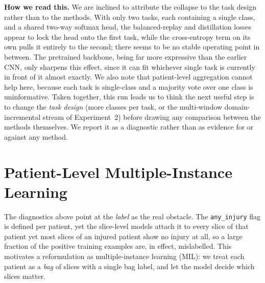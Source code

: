 \documentclass[11pt]{article}
\begin{document}
\noindent\textbf{How we read this.} We are inclined to attribute the collapse to
the task design rather than to the methods. With only two tasks, each containing a
single class, and a shared two-way softmax head, the balanced-replay and
distillation losses appear to lock the head onto the first task, while the
cross-entropy term on its own pulls it entirely to the second; there seems to be
no stable operating point in between. The pretrained backbone, being far more
expressive than the earlier CNN, only sharpens this effect, since it can fit
whichever single task is currently in front of it almost exactly. We also note
that patient-level aggregation cannot help here, because each task is single-class
and a majority vote over one class is uninformative. Taken together, this run
leads us to think the next useful step is to change the \emph{task design} (more
classes per task, or the multi-window domain-incremental stream of
Experiment~2) before drawing any comparison between the methods themselves. We
report it as a diagnostic rather than as evidence for or against any method.

\section{Patient-Level Multiple-Instance Learning}\label{sec:mil}
The diagnostics above point at the \emph{label} as the real obstacle. The
\texttt{any\_injury} flag is defined per patient, yet the slice-level models
attach it to every slice of that patient yet most slices of an injured patient
show no injury at all, so a large fraction of the positive training examples are,
in effect, mislabelled. This motivates a reformulation as multiple-instance
learning (MIL): we treat each patient as a \emph{bag} of slices with a single
bag label, and let the model decide which slices matter.
\end{document}

